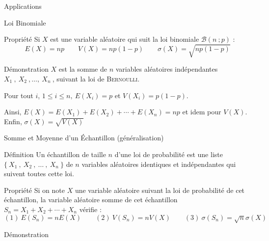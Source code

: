 \documentclass{coursbook}
\begin{document}
    \begin{Gpartie}{Applications} 
        \begin{Spartie}{Loi Binomiale} 
            \begin{SSpartie}{Propriété} 
                Si $X$ est une variable aléatoire qui suit la loi binomiale $\mathcal{B}\left(n~;p\right)$ : \[E(X)=np\qquad V(X)=np\left(1-p\right)\qquad\sigma(X)=\sqrt{np\left(1-p\right)}\]
                \begin{SSSpartie}{Démonstration} 
                    $X$ est la somme de $n$ variables aléatoires indépendantes $X_1~,~X_2~,\dotsc,~X_n~$, suivant la loi de \textsc{Bernoulli}.

                    Pour tout $i$, $1\leq i\leq n,~E\left(X_i\right)=p$ et $V\left(X_i\right)=p\left(1-p\right)$.

                    Ainsi, $E(X)=E\left(X_1\right)+E\left(X_2\right)+\dotsb+E\left(X_n\right)=np$ et idem pour $V(X)$. \\
                    Enfin, $\sigma(X)=\sqrt{V(X)}$
                \end{SSSpartie}
            \end{SSpartie}
        \end{Spartie}
        \begin{Spartie}{Somme et Moyenne d'un Échantillon (généralisation)} 
            \begin{SSpartie}{Définition} 
                Un échantillon de taille $n$ d'une loi de probabilité est une liste $\big\{~X_1~,~X_2~,~\dotsc~,~X_n~\big\}$ de $n$ variables aléatoires identiques et indépendantes qui suivent toutes cette loi.
            \end{SSpartie}
            \begin{SSpartie}{Propriété} 
                Si on note $X$ une variable aléatoire suivant la loi de probabilité de cet échantillon, la variable aléatoire \og somme \fg{} de cet échantillon $S_n=X_1+X_2+\dotsb+X_n$ vérifie : \[(1)~E\left(S_n\right)=nE(X)\qquad(2)~V\left(S_n\right)=nV(X)\qquad(3)~\sigma\left(S_n\right)=\sqrt{n}\sigma(X)\]
                \begin{SSSpartie}{Démonstration} 
\end{SSSpartie}
\end{SSpartie}
\end{Spartie}
\end{Gpartie}
\end{document}
